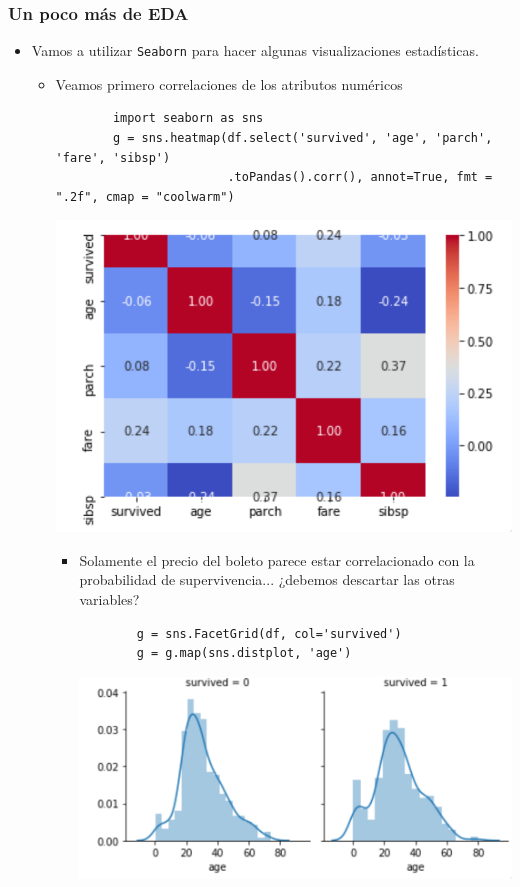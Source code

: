 \documentclass[leqno, 10pt, envcountsect]{beamer}
\numberwithin{equation}{section}
\theoremstyle{definition}
\theoremstyle{example}
\numberwithin{figure}{section}
\numberwithin{table}{section}
\let\olditem\item
\renewcommand{\item}{%
\olditem\vspace{1pt}}
\begin{document}
\begin{frame}[fragile]
  \frametitle{Un poco más de EDA}
  \begin{itemize}
    \item Vamos a utilizar \texttt{Seaborn} para hacer algunas visualizaciones
      estadísticas.
      \begin{itemize}
        \item Veamos primero correlaciones de los atributos numéricos
        \begin{verbatim}
        import seaborn as sns
        g = sns.heatmap(df.select('survived', 'age', 'parch', 'fare', 'sibsp')
                        .toPandas().corr(), annot=True, fmt = ".2f", cmap = "coolwarm")
        \end{verbatim}
        \begin{center}
          \includegraphics[scale=0.15]{corr.png}
        \end{center}
        \begin{itemize}
          \item Solamente el precio del boleto parece estar correlacionado con
            la probabilidad de supervivencia... ¿debemos descartar las otras
            variables?
        \begin{verbatim}
        g = sns.FacetGrid(df, col='survived')
        g = g.map(sns.distplot, 'age')
        \end{verbatim}
        \begin{center}
          \includegraphics[scale=0.14]{facet.png}
        \end{center}
        \end{itemize}
      \end{itemize}
  \end{itemize}
\end{frame}
\end{document}
